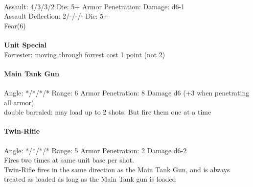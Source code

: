\ \\
Assault: 4/3/3/2 Die: 5+ Armor Penetration:  Damage: d6-1 \\
Assault Deflection: 2/-/-/- Die: 5+\\
\indent Fear(6) \\
\ \\

{\bf Unit Special} \\
Forrester: moving through forrest cost 1 point (not 2)
\ \\
\ \\
{\bf Main Tank Gun } \\
\ \\
Angle: */*/*/* Range: 6 Armor Penetration: 8 Damage d6 (+3 when penetrating all armor) \\
\indent double barraled: may load up to 2 shots. But fire them one at a time \\



\ \\
{\bf Twin-Rifle } \\
\ \\
Angle: */*/*/* Range: 5 Armor Penetration: 2 Damage d6-2 \\
\indent Fires two times at same unit base per shot.\\Twin-Rifle fires in the same direction as the Main Tank Gun, and is always treated as loaded as long as the Main Tank gun is loaded \\






